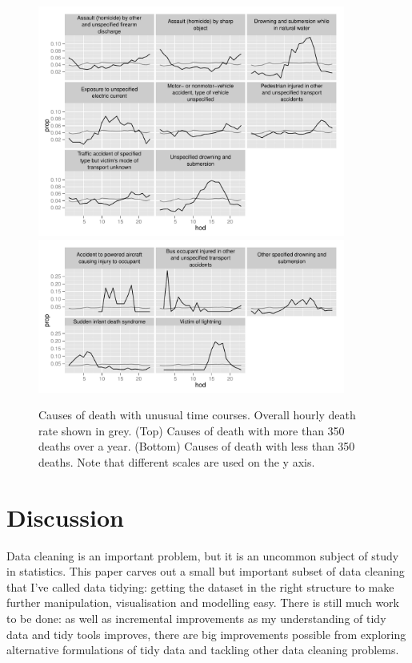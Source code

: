 \documentclass[article]{jss}
\begin{document}
\begin{figure}[htbp]
  \centering
    \includegraphics[width=0.9\textwidth]{case-study/unusual-big}
    \includegraphics[width=0.9\textwidth]{case-study/unusual-sml}
  \caption{Causes of death with unusual time courses. Overall hourly death rate shown in grey. (Top) Causes of death with more than 350 deaths over a year. (Bottom) Causes of death with less than 350 deaths.  Note that different scales are used on the y axis.}
  \label{fig:disease}
\end{figure}

\section{Discussion}
\label{sec:discussion}

Data cleaning is an important problem, but it is an uncommon subject of study in statistics. This paper carves out a small but important subset of data cleaning that I've called data tidying: getting the dataset in the right structure to make further manipulation, visualisation and modelling easy. There is still much work to be done: as well as incremental improvements as my understanding of tidy data and tidy tools improves, there are big improvements possible from exploring alternative formulations of tidy data and tackling other data cleaning problems.
\end{document}
